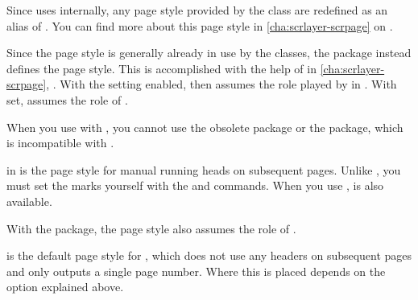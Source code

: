 \begin{description}
  Since  uses
  \hyperref[cha:scrlayer-scrpage]{} internally, any
  page style  provided by the class are
  redefined as an alias of .
  You can find more about this page style in \autoref{cha:scrlayer-scrpage} on
  .
\item[{\PageStyle{letter}}]
  Since the  page style is generally already in use by
  the classes, the  package instead
  defines the  page style. This is accomplished with the
  help of \hyperref[cha:scrlayer-scrpage]{} in
  \autoref{cha:scrlayer-scrpage}, . With the
   setting enabled,  then assumes the
  role played by  in . With
   set,  assumes the role of
  .

  When you use
  \hyperref[cha:scrlayer-scrpage]{} with
  , you cannot use the obsolete
   package or the
   package, which is incompatible
  with \KOMAScript{}.
\item[{\PageStyle{myheadings}}]
  in  is the page style for manual
  running heads on subsequent pages. Unlike , you must set
  the marks yourself with the
   and
   commands. When you
  use \hyperref[cha:scrlayer-scrpage]{},
   is also
  available.

  With the  package, the
   page style also assumes the role of
  .
\item[{\PageStyle{plain}}]
  is the default page style for ,
  which does not use any headers on subsequent pages and only outputs
  a single page number. Where this is placed depends on the
   option explained above.


\end{description}
